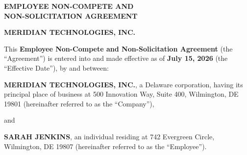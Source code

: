 \documentclass[11pt,a4paper]{article}
\begin{document}
\thispagestyle{plain}

\noindent\makebox[\linewidth]{\color{legalaccent}\rule{\linewidth}{2pt}}
\vspace{1.5ex}

\begin{center}
    {\Huge\bfseries\color{legalnavy} EMPLOYEE NON-COMPETE AND \\ NON-SOLICITATION AGREEMENT}
    \vspace{1.5ex}
    
    {\large\color{legalaccent}\textbf{MERIDIAN TECHNOLOGIES, INC.}}
\end{center}

\vspace{1ex}
\noindent\makebox[\linewidth]{\color{legalaccent}\rule{\linewidth}{1pt}}
\vspace{3ex}

\noindent
This \textbf{Employee Non-Compete and Non-Solicitation Agreement} (the ``Agreement'') is entered into and made effective as of \textbf{July 15, 2026} (the ``Effective Date''), by and between:

\vspace{1.5ex}
\noindent
\textbf{MERIDIAN TECHNOLOGIES, INC.}, a Delaware corporation, having its principal place of business at 500 Innovation Way, Suite 400, Wilmington, DE 19801 (hereinafter referred to as the ``Company''),

\vspace{1ex}
\noindent
and

\vspace{1ex}
\noindent
\textbf{SARAH JENKINS}, an individual residing at 742 Evergreen Circle, Wilmington, DE 19807 (hereinafter referred to as the ``Employee'').
\end{document}
